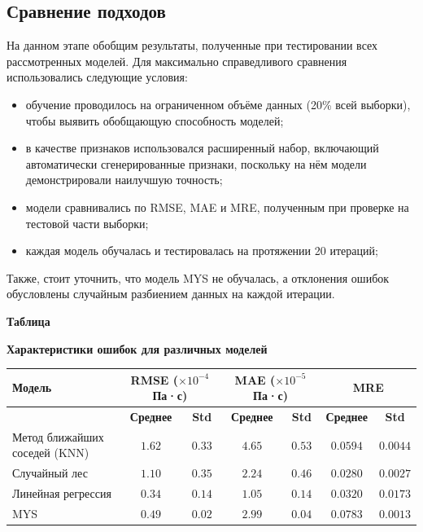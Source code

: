 \documentclass[a4paper,12pt]{article}
\newcommand{\TableNumberRight}{
  \refstepcounter{table}%
  \noindent\hfill\textbf{Таблица \thetable}
}
\begin{document}
  \subsection{Сравнение подходов}

    На данном этапе обобщим результаты, полученные при тестировании всех рассмотренных моделей. Для максимально справедливого сравнения использовались следующие условия:
    \begin{itemize}
      \item обучение проводилось на ограниченном объёме данных (20\% всей выборки), чтобы выявить обобщающую способность моделей;
      \item в качестве признаков использовался расширенный набор, включающий автоматически сгенерированные признаки, поскольку на нём модели демонстрировали наилучшую точность;
      \item модели сравнивались по RMSE, MAE и MRE, полученным при проверке на тестовой части выборки;
      \item каждая модель обучалась и тестировалась на протяжении 20 итераций;
    \end{itemize}

    Также, стоит уточнить, что модель MYS не обучалась, а отклонения ошибок обусловлены случайным разбиением данных на каждой итерации.

    \begin{table}[ht!]
      \TableNumberRight
      \begin{center}
        \textbf{Характеристики ошибок для различных моделей}
        \vspace*{\fill}
      \end{center}

      \vspace{0.8ex}
      \noindent
      \begin{tabular}{|l|c|c|c|c|c|c|}
          \hline
          \textbf{Модель} & \multicolumn{2}{c|}{\textbf{RMSE} (\(\times 10^{-4}\) Па·с)} & \multicolumn{2}{c|}{\textbf{MAE} (\(\times 10^{-5}\) Па·с)} & \multicolumn{2}{c|}{\textbf{MRE}} \\
          \hline
          & \textbf{Среднее} & \textbf{Std} & \textbf{Среднее} & \textbf{Std} & \textbf{Среднее} & \textbf{Std} \\
          \hline
          Метод ближайших соседей (KNN) & \( 1.62 \) & \( 0.33 \) & \( 4.65 \) & \( 0.53 \) & \( 0.0594 \) & \( 0.0044 \) \\
          Случайный лес                 & \( 1.10 \) & \( 0.35 \) & \( 2.24 \) & \( 0.46 \) & \( 0.0280 \) & \( 0.0027 \) \\
          Линейная регрессия            & \( 0.34 \) & \( 0.14 \) & \( 1.05 \) & \( 0.14 \) & \( 0.0320 \) & \( 0.0173 \) \\
          MYS                           & \( 0.49 \) & \( 0.02 \) & \( 2.99 \) & \( 0.04 \) & \( 0.0783 \) & \( 0.0013 \) \\
          \hline
      \end{tabular}

      \label{tab:model_comparison}
\end{table}
\end{document}
